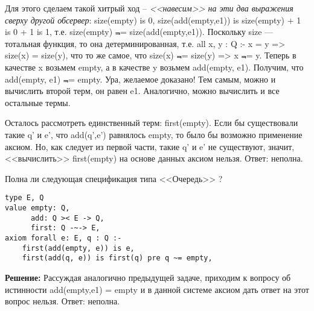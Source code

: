 Для этого сделаем такой хитрый ход -- \emph{<<навесим>> на эти два выражения сверху другой обсервер}: size(empty) is 0, size(add(empty,e1)) is size(empty) + 1 is 0 + 1 is 1, т.е. size(empty) $\Not$= size(add(empty,e1)). Поскольку size --- тотальная функция, то она детерминированная, т.е. all x, y : Q :- x = y => size(x) = size(y), что то же самое, что size(x) $\Not$= size(y) => x $\Not$= y. Теперь в качестве x возьмем empty, а в качестве y возьмем add(empty, e1). Получим, что add(empty, e1) $\Not$= empty. Ура, желаемое доказано! Тем самым, можно и вычислить второй терм, он равен e1. Аналогично, можно вычислить и все остальные термы.

Осталось рассмотреть единственный терм: first(empty). Если бы существовали такие q' и e', что add(q',e') равнялось empty, то было бы возможно применение аксиом. Но, как следует из первой части, такие q' и e' не существуют, значит, <<вычислить>> first(empty) на основе данных аксиом нельзя. Ответ: неполна.

\z Полна ли следующая спецификация типа <<Очередь>> ?
\begin{lstlisting}
type E, Q
value empty: Q,
      add: Q >< E -> Q,
      first: Q -~-> E,
axiom forall e: E, q : Q :-
    first(add(empty, e)) is e,
    first(add(q, e)) is first(q) pre q ~= empty,
\end{lstlisting}

\textbf{Решение:}
Рассуждая аналогично предыдущей задаче, приходим к вопросу об истинности add(empty,e1) = empty и в данной системе аксиом дать ответ на этот вопрос нельзя. Ответ: неполна.






